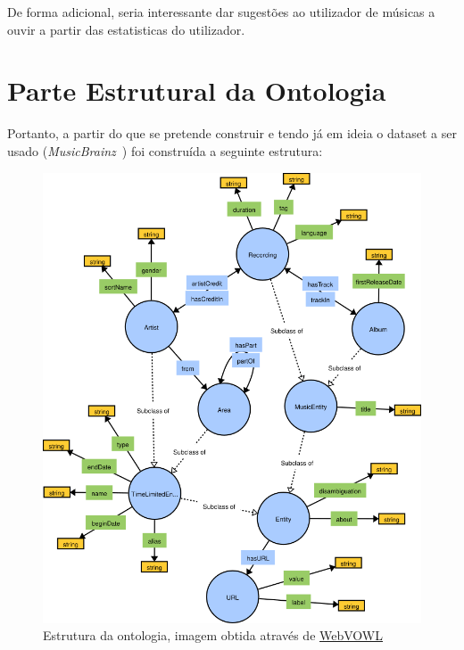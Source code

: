 \documentclass{article}
\begin{document}
De forma adicional, seria interessante dar sugestões ao utilizador de músicas a ouvir a partir das estatisticas do utilizador.

\section{Parte Estrutural da Ontologia}

Portanto, a partir do que se pretende construir e tendo já em ideia o dataset a ser usado (\textit{MusicBrainz}~\cite{mbSchema}) foi construída a seguinte estrutura:

\begin{figure}[H]
    \centering
    \includegraphics[width=15cm]{Pictures/ontologySctructure.png}
    \caption{Estrutura da ontologia, imagem obtida através de \protect\href{http://www.visualdataweb.de/webvowl/}{WebVOWL}}
\end{figure}
\end{document}
